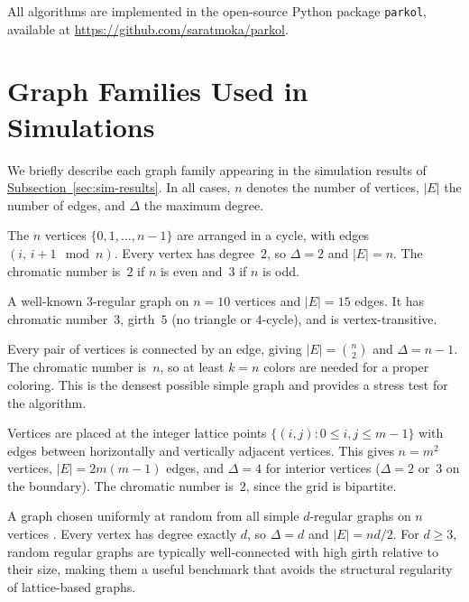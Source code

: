 \documentclass[12pt, a4paper]{article}
\theoremstyle{plain}
\theoremstyle{definition}
\theoremstyle{remark}
\newcommand{\sref}[2]{\hyperref[#2]{#1~\ref*{#2}}}
\begin{document}
All algorithms are implemented in the open-source Python package \texttt{parkol}, available at \url{https://github.com/saratmoka/parkol}.

\makeatletter
\def\doi#1{}
\makeatother




\appendix
\section{Graph Families Used in Simulations}\label{app:graphs}

We briefly describe each graph family appearing in the simulation results of \sref{Subsection}{sec:sim-results}. In all cases, \(n\) denotes the number of vertices, \(|E|\) the number of edges, and \(\Delta\) the maximum degree.

\begin{description}[style=nextline,leftmargin=2.5cm]

\item[Cycle graph \(C_n\).]
The \(n\) vertices \(\{0,1,\dots,n-1\}\) are arranged in a cycle, with edges \((i,\, i+1\!\!\mod n)\). Every vertex has degree~\(2\), so \(\Delta=2\) and \(|E|=n\). The chromatic number is~\(2\) if \(n\) is even and~\(3\) if \(n\) is odd.

\item[Petersen graph.]
A well-known \(3\)-regular graph on \(n=10\) vertices and \(|E|=15\) edges. It has chromatic number~\(3\), girth~\(5\) (no triangle or \(4\)-cycle), and is vertex-transitive.

\item[Complete graph \(K_n\).]
Every pair of vertices is connected by an edge, giving \(|E|=\binom{n}{2}\) and \(\Delta=n-1\). The chromatic number is~\(n\), so at least \(k=n\) colors are needed for a proper coloring. This is the densest possible simple graph and provides a stress test for the algorithm.

\item[Grid graph \(m\times m\).]
Vertices are placed at the integer lattice points \(\{(i,j):0\leq i,j\leq m-1\}\) with edges between horizontally and vertically adjacent vertices. This gives \(n=m^2\) vertices, \(|E|=2m(m-1)\) edges, and \(\Delta=4\) for interior vertices (\(\Delta=2\) or~\(3\) on the boundary). The chromatic number is~\(2\), since the grid is bipartite.

\item[Random \(d\)-regular graph.]
A graph chosen uniformly at random from all simple \(d\)-regular graphs on \(n\) vertices \cite{W99}. Every vertex has degree exactly \(d\), so \(\Delta=d\) and \(|E|=nd/2\). For \(d\geq3\), random regular graphs are typically well-connected with high girth relative to their size, making them a useful benchmark that avoids the structural regularity of lattice-based graphs.

\end{description}
\end{document}
